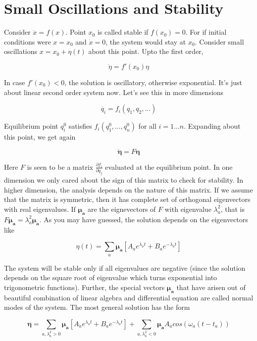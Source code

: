\documentclass{report}
\begin{document}
\section{Small Oscillations and Stability}

Consider $\ddot{x} = f(x)$. Point $x_0$ is called stable if $f(x_0) = 0$. For if initial conditions were $x=x_0$ and $\dot{x} = 0$, the system would stay at $x_0$. Consider small oscillations $x = x_0 + \eta(t)$ about this point. Upto the first order, 

$$\ddot{\eta} = f'(x_0)\eta$$

\noindent In case $f'(x_0) < 0$, the solution is oscillatory, otherwise exponential. It's just about linear second order system now. Let's see this in more dimensions

$$\ddot{q_i} = f_i(q_1,q_2,...)$$

\noindent Equilibrium point $q_i^{0}$ satisfies $f_i(q_1^0,...,q_n^0)$ for all $i=1...n$. Expanding about this point, we get again

$$\boldsymbol{\ddot{\eta}} = F \boldsymbol{\eta}$$

\noindent Here $F$ is seen to be a matrix $\frac{\partial f_i}{\partial q_j}$ evaluated at the equilibrium point. In one dimension we only cared about the sign of this matrix to check for stability. In higher dimension, the analysis depends on the nature of this matrix. If we assume that the matrix is symmetric, then it has complete set of orthogonal eigenvectors with real eigenvalues. If $\boldsymbol{\mu_a}$ are the eignevectors of $F$ with eigenvalue $\lambda_a^2$, that is $F\boldsymbol{\mu_a}= \lambda_a^2\boldsymbol{\mu_a}$. As you may have guessed, the solution depends on the eigenvectors like

$$\eta(t) = \sum_{a}\boldsymbol{\mu_a}\left[A_ae^{\lambda_a t} + B_ae^{-\lambda_a t}\right]$$

\noindent The system will be stable only if all eigenvalues are negative (since the solution depends on the square root of eigenvalue which turns exponential into trigonometric functions). Further, the special vectors $\boldsymbol{\mu_a}$ that have arisen out of beautiful combination of linear algebra and differential equation are called normal modes of the system. The most general solution has the form

$$\boldsymbol{\eta} = \sum_{a,\lambda_a^2>0}\boldsymbol{\mu_a}\left[ A_ae^{\lambda_a t} + B_ae^{-\lambda_a t}\right] + \sum_{a,\lambda_a^2<0}\boldsymbol{\mu_a}A_a cos(\omega_a(t-t_a))$$
\end{document}
